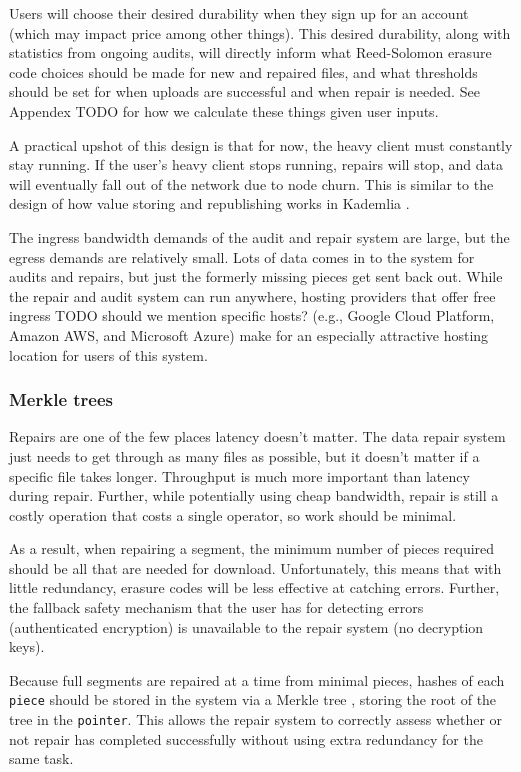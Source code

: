\documentclass[a4paper,10pt]{article} \usepackage[utf8]{inputenc}
\newcommand{\x}[1]{{\tt #1}} \newcommand{\code}[1]{{\tt #1}}
\newcommand{\todo}[1]{{\color{red} TODO #1 }}
\begin{document}
Users will choose their desired durability when they sign up for an account
(which may impact price among other things). This desired durability, along with
statistics from ongoing audits, will directly inform what Reed-Solomon erasure
code choices should be made for new and repaired files, and what thresholds
should be set for when uploads are successful and when repair is needed. See
Appendex \todo{} for how we calculate these things given user inputs.

A practical upshot of this design is that for now, the heavy client must
constantly stay running. If the user's heavy client stops running, repairs will
stop, and data will eventually fall out of the network due to node churn. This
is similar to the design of how value storing and republishing works in
Kademlia \cite{kad}.

The ingress bandwidth demands of the audit and repair system are large, but the
egress demands are relatively small. Lots of data comes in to the system for
audits and repairs, but just the formerly missing pieces get sent back out.
While the repair and audit system can run anywhere, hosting providers
that offer free ingress \todo{should we mention specific hosts?
(e.g., Google Cloud Platform, Amazon AWS, and Microsoft Azure)}
make for an especially attractive
hosting location for users of this system.

\subsubsection{Merkle trees}

Repairs are one of the few places latency doesn't matter. The data repair system
just needs to get through as many files as possible, but it doesn't matter if
a specific file takes longer. Throughput is much more important than
latency during repair. Further, while potentially using cheap bandwidth, repair
is still a costly operation that costs a single operator, so work should be
minimal.

As a result, when repairing a segment, the minimum number of pieces required
should be all that are needed for download. Unfortunately, this means that
with little redundancy, erasure codes will be less effective at catching errors.
Further, the fallback safety mechanism that the user has for detecting errors
(authenticated encryption) is unavailable to the repair system (no decryption
keys).

Because full segments are repaired at a time from minimal pieces, hashes of
each \x{piece} should be stored in the system via a Merkle tree
\cite{merkle-tree}, storing the root of the tree in the \x{pointer}. This allows
the repair system to correctly assess whether or not repair has completed
successfully without using extra redundancy for the same task.
\end{document}
